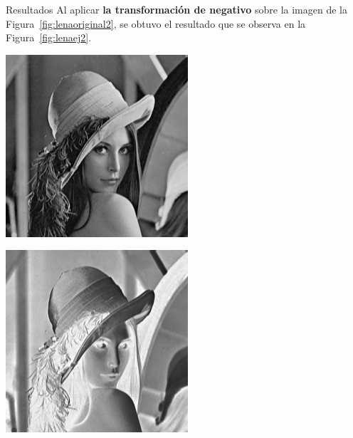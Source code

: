 \documentclass{beamer}
\begin{document}
\begin{frame}[fragile]{Resultados}
	\justifying
    Al aplicar \textcolor{unahurverde}{\textbf{la transformación de negativo}} sobre la imagen de la Figura~\ref{fig:lenaoriginal2}, 
    se obtuvo el resultado que se observa en la Figura~\ref{fig:lenaej2}.
	\vspace{0.5cm}
	
	\centering
	\begin{minipage}{0.45\linewidth}
		\centering
		\includegraphics[width=\linewidth]{../results/lena_original}
		\label{fig:lenaoriginal2}
	\end{minipage}\hfill
	\begin{minipage}{0.45\linewidth}
		\centering
		\includegraphics[width=\linewidth]{../results/lena_ej2}

\end{minipage}
\end{frame}
\end{document}

